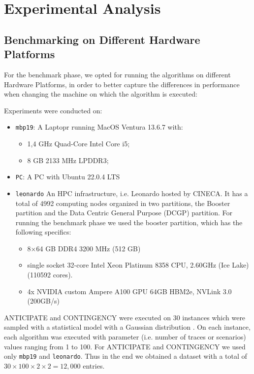 \documentclass[a4paper,singleside,12pt]{report} %
\begin{document}
\chapter{Experimental Analysis}

\section{Benchmarking on Different Hardware Platforms}

For the benchmark phase, we opted for running the algorithms on different Hardware Platforms, in order to better capture the differences in performance
when changing the machine on which the algorithm is executed:

Experiments were conducted on:
\begin{itemize}
\item \verb|mbp19|: A Laptopr running MacOS Ventura 13.6.7 with:
    \begin{itemize}
        \item 1,4 GHz Quad-Core Intel Core i5;
        \item 8 GB 2133 MHz LPDDR3;
    \end{itemize}
\item \verb|PC|: A PC with Ubuntu 22.0.4 LTS
\item \verb|leonardo| An HPC infrastructure, i.e. Leonardo hosted by CINECA. It has a total of 4992 computing nodes organized in two partitions, the Booster partition and the Data Centric General Purpose (DCGP) partition. For running the benchmark phase we used the booster partition, which has the following specifics:
    \begin{itemize}
        \item 8×64 GB DDR4 3200 MHz (512 GB)
        \item single socket 32-core Intel Xeon Platinum 8358 CPU, 2.60GHz (Ice Lake) (110592 cores).
        \item 4x NVIDIA custom Ampere A100 GPU 64GB HBM2e, NVLink 3.0 (200GB/s)
    \end{itemize}
\end{itemize}

ANTICIPATE and CONTINGENCY were executed on 30 instances which were sampled with a statistical model with a Gaussian distribution \cite{DEFILIPPO2022109199}.
On each instance, each algorithm was executed with parameter (i.e. number of traces or scenarios) values ranging from 1 to 100. For ANTICIPATE and CONTINGENCY we
used only \verb|mbp19| and \verb|leonardo|. Thus in the end we obtained a dataset with a total of $30 \times 100 \times 2 \times 2 = 12,000$ entries.
\end{document}
